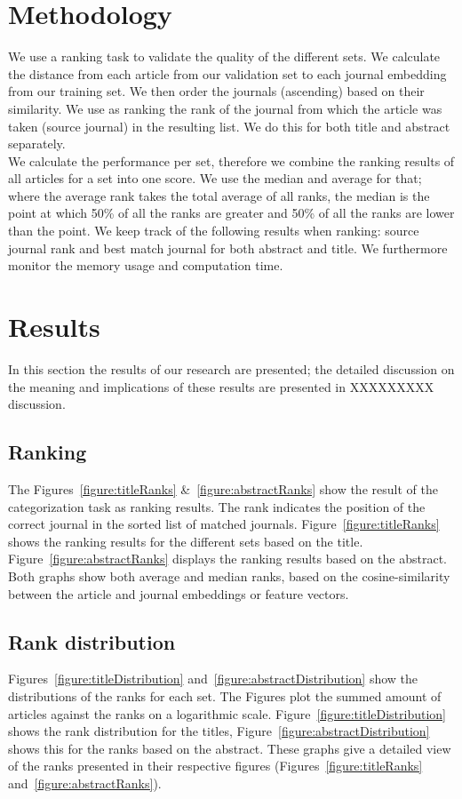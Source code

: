 \documentclass[runningheads]{llncs}
\begin{document}
\section{Methodology}
We use a ranking task to validate the quality of the different sets. We calculate the distance from each article from our validation set to each journal embedding from our training set. We then order the journals (ascending) based on their similarity. We use as ranking the rank of the journal from which the article was taken (source journal) in the resulting list. We do this for both title and abstract separately.\\
We calculate the performance per set, therefore we combine the ranking results of all articles for a set into one score. We use the median and average for that; where the average rank takes the total average of all ranks, the median is the point at which 50\% of all the ranks are greater and 50\% of all the ranks are lower than the point. We keep track of the following results when ranking: source journal rank and best match journal for both abstract and title. We furthermore monitor the memory usage and computation time.
\section{Results}
In this section the results of our research are presented; the detailed discussion on the meaning and implications of these results are presented in XXXXXXXXX discussion.
\subsection{Ranking}
The Figures~\ref{figure:titleRanks} \&~\ref{figure:abstractRanks} show the result of the categorization task as ranking results. The rank indicates the position of the correct journal in the sorted list of matched journals. Figure~\ref{figure:titleRanks} shows the ranking results for the different sets based on the title. Figure~\ref{figure:abstractRanks} displays the ranking results based on the abstract. Both graphs show both average and median ranks, based on the cosine-similarity between the article and journal embeddings or feature vectors.
\subsection{Rank distribution}
Figures~\ref{figure:titleDistribution} and~\ref{figure:abstractDistribution} show the distributions of the ranks for each set. The Figures plot the summed amount of articles against the ranks on a logarithmic scale. Figure~\ref{figure:titleDistribution} shows the rank distribution for the titles, Figure~\ref{figure:abstractDistribution} shows this for the ranks based on the abstract. These graphs give a detailed view of the ranks presented in their respective figures (Figures~\ref{figure:titleRanks} and~\ref{figure:abstractRanks}).
\end{document}
